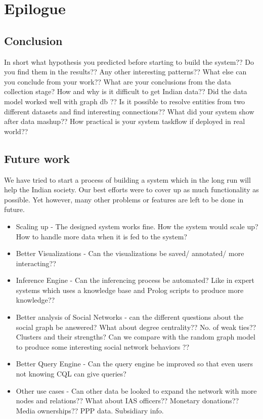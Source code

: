 \chapter{Epilogue}
\section{Conclusion}
 In short what hypothesis you predicted before starting to build the system?? Do you find them in the results?? Any other interesting patterns?? 
What else can you conclude from your work?? What are your conclusions from the data collection stage? How and why is it difficult to get Indian data?? Did the data model worked well with graph db ?? Is it possible to resolve entities from two different datasets and find interesting connections??  What did your system show after data mashup?? How practical is your system taskflow if deployed in real world??

\section{Future work}
We have tried to start a process of building a system which in the long run will help the Indian society. Our best efforts were to cover up as much functionality as possible. Yet however, many other problems or features are left to be done in future.
\begin{itemize}
\item Scaling up - The designed system works fine. How the system would scale up? How to handle more data when it is fed to the system?
\item Better Visualizations - Can the visualizations be saved/ annotated/ more interacting??
\item Inference Engine - Can the inferencing process be automated? Like in expert systems which uses a knowledge base and Prolog scripts to produce more knowledge??
\item Better analysis of Social Networks - can the different questions about the social graph be answered? What about degree centrality?? No. of weak ties?? Clusters and their strengths? Can we compare with the random graph model to produce some interesting social network behaviors ??
\item Better Query Engine - Can the query engine be improved so that even users not knowing CQL can give queries?
\item Other use cases - Can other data be looked to expand the network with more nodes and relations?? What about IAS officers?? Monetary donations?? Media ownerships?? PPP data. Subsidiary info. 
\end{itemize}
